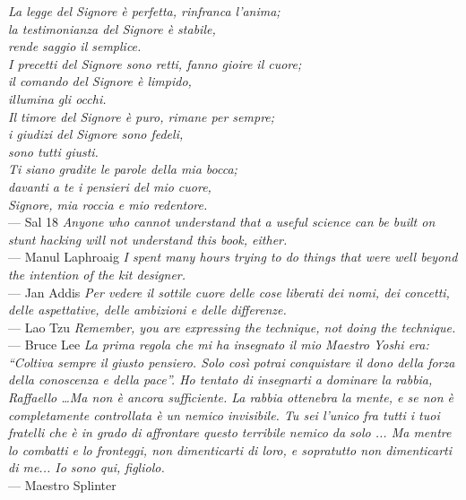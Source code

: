 
\newpage\thispagestyle{empty}
\noindent\textit{La legge del Signore \`e perfetta, rinfranca l’anima; \\
\indent la testimonianza del Signore \`e stabile, \\
\indent rende saggio il semplice. \\
\noindent I precetti del Signore sono retti, fanno gioire il cuore; \\
\indent il comando del Signore \`e limpido, \\
\indent illumina gli occhi. \\
\noindent Il timore del Signore \`e puro, rimane per sempre; \\
\indent i giudizi del Signore sono fedeli, \\
\indent sono tutti giusti. \\
\noindent Ti siano gradite le parole della mia bocca; \\
\indent davanti a te i pensieri del mio cuore, \\
\indent Signore, mia roccia e mio redentore.} \\ \medskip --- Sal 18
\vfill
\noindent\textit{Anyone who cannot understand that a useful science can be
built on stunt hacking will not understand this book, either.}\\ \medskip --- Manul Laphroaig
\vfill
\noindent\textit{I spent many hours trying to do things that were well beyond
the intention of the kit designer.}\\ \medskip --- Jan Addis
\vfill
\noindent\textit{Per vedere il sottile cuore delle cose liberati dei nomi,
dei concetti, delle aspettative, delle ambizioni e delle differenze. }\\
\medskip --- Lao Tzu
\vfill
\noindent\textit{Remember, you are expressing the technique, not doing the technique.}\\
\medskip --- Bruce Lee
\vfill
\textit{%
La prima regola che mi ha insegnato il mio Maestro Yoshi era:
``Coltiva sempre il giusto pensiero. Solo cos\`i potrai conquistare
il dono della forza della conoscenza e della pace''. Ho tentato di
insegnarti a dominare la rabbia, Raffaello \ldots Ma non \`e ancora
sufficiente.  La rabbia ottenebra la mente, e se non \`e
completamente controllata \`e un nemico invisibile. Tu sei l'unico
fra tutti i tuoi fratelli che \`e in grado di affrontare questo
terribile nemico da solo ... Ma mentre lo combatti e lo fronteggi,
non dimenticarti di loro, e sopratutto non dimenticarti di me...  Io
sono qui, figliolo.  }\\ \medskip --- Maestro Splinter
